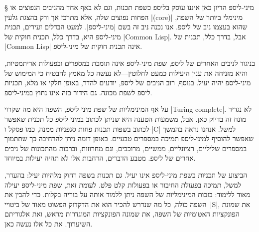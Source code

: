 %
%
%
%

§ מיני-ליספ
הדיון כאן איננו עוסק בליספ כשפת תכנות, וגם לא באף אחד מהניבים הנפוצים או הפחות
נפוצים שלה, אלא מתרכז אך ורק בהצגת גלעין \E|(core)| מינימלי ביותר של השפה, שהוא
בעצמו ניב של ליספ. אנו נכנה ניב זה בשם \ע|מיני-ליספ|. למעט הבדלים זעירים, תכנית
מיני-ליספ היא, בדרך כלל, תכנית חוקית של \E|Common Lisp|. אבל, בדרך כלל, תכנית
של \E|Common Lisp| אינה תכנית חוקית של מיני-ליספ.

בניגוד לניבים האחרים של ליספ, שפת מיני-ליספ אינה תומכת במספרים ובפעולות
אריתמטיות, והיא מזניחה את ענין היעילות כמעט לחלוטין---לא נעשה כל מאמץ להבטיח כי
המימוש של מיני-ליספ יהיה יעיל. בנוסף, רוב הניבים של ליספ, יודעים להדר, באופן
חלקי או מלא, תכניות ליספ לשפת מכונה. גם הידור כזה אינו נחוץ במיני-ליספ.

על אף המינימליות של שפת מיני-ליספ, השפה היא מה שקרוי \E|Turing complete|. לא
נגדיר מונח זה בדיוק כאן. אבל, משמעות הטענה היא שניתן לכתוב במיני-ליספ כל תכנית
שאפשר לכתוב בשפות תכנות פחות סגפניות ממנה, כמו פסקל ו-\E|C| למשל. אנחנו
נראה בהמשך שאפשר להוסיף למיני-ליספ תמיכה במספרים טבעיים. באופן דומה ניתן
להרחיבה כך שתתמוך במספרים שליליים, רציונליים, ממשיים, מרוכבים, וגם מחרוזות,
וברבות מהתכונות של ניבים אחרים של ליספ. מטבע הדברים, הרחבות אלו לא תהיה יעילות
במיוחד.

הביצוע של תכניות בשפת מיני-ליספ אינו יעיל. גם תכנות בשפה רחוק מלהיות יעיל:
בהעדר, למשל, תמיכה בפעולת החיבור או בפעולות קלט פלט. לעומת זאת, שפת מיני-ליספ
יעילה מאוד ללימוד: בזכות המינימליות של השפה ניתן ללמוד אותה על בוריה בקלות.
כדי להבין את השפה כולה, כל מה שנדרש להכיר הוא את הדקדוק הפשוט מאוד של
ביטויי~\E|S|, את שמונת הפונקציות האטומיות של השפה, את שמונה הפונקציות המוגדרות
מראש, ואת אלגוריתם השיערוך. את כל אלו נעשה כאן.

